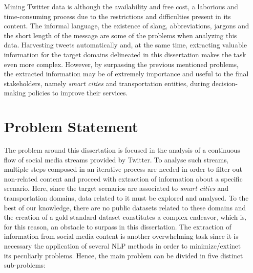 Mining Twitter data is although the availability and free cost, a laborious and time-consuming process due to the restrictions and difficulties present in its content. The informal language, the existence of slang, abbreviations, jargons and the short length of the message are some of the problems when analyzing this data. Harvesting tweets automatically and, at the same time, extracting valuable information for the target domains delineated in this dissertation makes the task even more complex. However, by surpassing the previous mentioned problems, the extracted information may be of extremely importance and useful to the final stakeholders, namely \textit{smart cities} and transportation entities, during decision-making policies to improve their services.

\section{Problem Statement}\label{sec:problem}
The problem around this dissertation is focused in the analysis of a continuous flow of social media streams provided by Twitter. To analyse such streams, multiple steps composed in an iterative process are needed in order to filter out non-related content and proceed with extraction of information about a specific scenario. Here, since the target scenarios are associated to \textit{smart cities} and transportation domains, data related to it must be explored and analysed. To the best of our knowledge, there are no public datasets related to these domains and the creation of a gold standard dataset constitutes a complex endeavor, which is, for this reason, an obstacle to surpass in this dissertation. The extraction of information from social media content is another overwhelming task since it is necessary the application of several NLP methods in order to minimize/extinct its peculiarly problems. Hence, the main problem can be divided in five distinct sub-problems:

